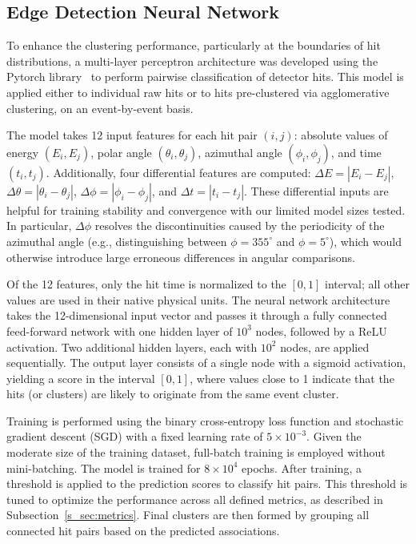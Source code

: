 \subsection{Edge Detection Neural Network}
To enhance the clustering performance, particularly at the boundaries of hit distributions, a multi-layer perceptron architecture was developed using the Pytorch library~\cite{imambi2021pytorch} to perform pairwise classification of detector hits. This model is applied either to individual raw hits or to hits pre-clustered via agglomerative clustering, on an event-by-event basis.

The model takes 12 input features for each hit pair $(i, j)$: absolute values of energy $(E_i, E_j)$, polar angle $(\theta_i, \theta_j)$, azimuthal angle $(\phi_i, \phi_j)$, and time $(t_i, t_j)$. Additionally, four differential features are computed: $\Delta E = |E_i - E_j|$, $\Delta \theta = |\theta_i - \theta_j|$, $\Delta \phi = |\phi_i - \phi_j|$, and $\Delta t = |t_i - t_j|$. These differential inputs are helpful for training stability and convergence with our limited model sizes tested. In particular, $\Delta \phi$ resolves the discontinuities caused by the periodicity of the azimuthal angle (e.g., distinguishing between $\phi = 355^\circ$ and $\phi = 5^\circ$), which would otherwise introduce large erroneous differences in angular comparisons.

Of the 12 features, only the hit time is normalized to the $[0, 1]$ interval; all other values are used in their native physical units.
The neural network architecture takes the 12-dimensional input vector and passes it through a fully connected feed-forward network with one hidden layer of $10^3$ nodes, followed by a ReLU activation. Two additional hidden layers, each with $10^2$ nodes, are applied sequentially. The output layer consists of a single node with a sigmoid activation, yielding a score in the interval $[0, 1]$, where values close to 1 indicate that the hits (or clusters) are likely to originate from the same event cluster.\newline

Training is performed using the binary cross-entropy loss function \cite{mannor2005cross,de2005tutorial} and stochastic gradient descent (SGD) \cite{newton2018recent} with a fixed learning rate of $5 \times 10^{-3}$. Given the moderate size of the training dataset, full-batch training is employed without mini-batching. The model is trained for $8 \times 10^4$ epochs. After training, a threshold is applied to the prediction scores to classify hit pairs. This threshold is tuned to optimize the performance across all defined metrics, as described in Subsection~\ref{s_sec:metrics}. Final clusters are then formed by grouping all connected hit pairs based on the predicted associations.

